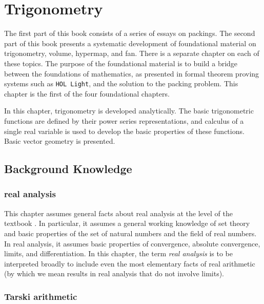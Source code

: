 \chapter{Trigonometry}
\label{part:trig}
%

\begin{summary}
  The first part of this book consists of a series of essays on
  packings.  The second part of this book presents a systematic
  development of foundational material on trigonometry, volume,
  hypermap, and fan.  There is a separate chapter on each of these
  topics.  The purpose of the foundational material is to build a
  bridge between the foundations of mathematics, as presented in
  formal theorem proving systems such as {\tt HOL Light}, and the
  solution to the packing problem.  This chapter is the first of the
  four foundational chapters.

  In this chapter, trigonometry is developed analytically.  The basic
  trigonometric functions are defined by their power series
  representations, and calculus of a single real variable is used to
  develop the basic properties of these functions.  Basic vector
  geometry is presented.
\end{summary}

\section{Background Knowledge}

\subsection{real analysis}
\label{back:analysis}  
  This chapter assumes general facts about
  \hypertarget{back:analysis}{real analysis} at the level of the
  textbook \cite{unknown}. %
  In particular, it assumes a general working knowledge of set theory 
and basic properties of the set of natural numbers and the
  field of real numbers.  In real analysis, it assumes basic
  properties of convergence, absolute convergence, limits, and
  differentiation.  In this chapter, the term {\it real analysis} is
  to be interpreted broadly to include even the most elementary facts
  of real arithmetic (by which we mean results in real analysis that
  do not involve limits).


\subsection{Tarski arithmetic}


